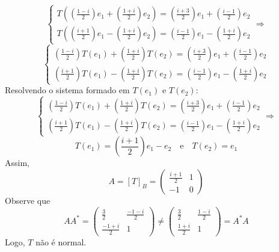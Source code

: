 \documentclass[11pt,a4paper]{article}
\begin{document}
{{\[\begin{cases}
T\left(\left(\frac{1 - i}{2}\right)e_1 + \left(\frac{1+i}{2} \right)e_2  \right) = \left(\frac{i+3}{2}\right)e_1 + \left(\frac{i-1}{2} \right)e_2 \\
T\left( \left(\frac{i + 1}{2}\right)e_1 - \left(\frac{1+i}{2} \right)e_2  \right) =  \left(\frac{i - 1}{2}\right)e_1 - \left(\frac{1+i}{2} \right)e_2 
\end{cases}
\Rightarrow \]\[
\begin{cases}
\left(\frac{1 - i}{2}\right)T(e_1) + \left(\frac{1+i}{2} \right)T(e_2) = \left(\frac{i+3}{2}\right)e_1 + \left(\frac{i-1}{2} \right)e_2 \\
\left(\frac{i + 1}{2}\right) T(e_1) - \left(\frac{1+i}{2} \right) T(e_2) =  \left(\frac{i - 1}{2}\right)e_1 - \left(\frac{1+i}{2} \right)e_2
\end{cases}
\]
Resolvendo o sistema formado em $T(e_1)$ e $T(e_2):$
\[
\begin{cases}
\left(\frac{1 - i}{2}\right)T(e_1) + \left(\frac{1+i}{2} \right)T(e_2) = \left(\frac{i+3}{2}\right)e_1 + \left(\frac{i-1}{2} \right)e_2 \\
\left(\frac{i + 1}{2}\right) T(e_1) - \left(\frac{1+i}{2} \right) T(e_2) =  \left(\frac{i - 1}{2}\right)e_1 - \left(\frac{1+i}{2} \right)e_2
\end{cases} \Rightarrow \]\[
T(e_1) = \left(\frac{i + 1}{2}\right)e_1 - e_2 \quad \mbox{e} \quad T(e_2) = e_1 
\]
Assim, 
\[
A = [T]_B = \begin{pmatrix}
\frac{i + 1}{2} & 1 \\
-1 & 0
\end{pmatrix}
\]
Observe que
\[
AA^{*} = \left(\begin{matrix}
\frac{3}{2} & \frac{-1-i}{2} \\
\frac{-1+i}{2} & 1
\end{matrix}\right) \neq \left(\begin{matrix}
\frac{3}{2} & \frac{1-i}{2} \\
\frac{1+i}{2} & 1
\end{matrix}\right) = A^{*}A
\]
Logo, $T$ não é normal.
}

}
\end{document}
